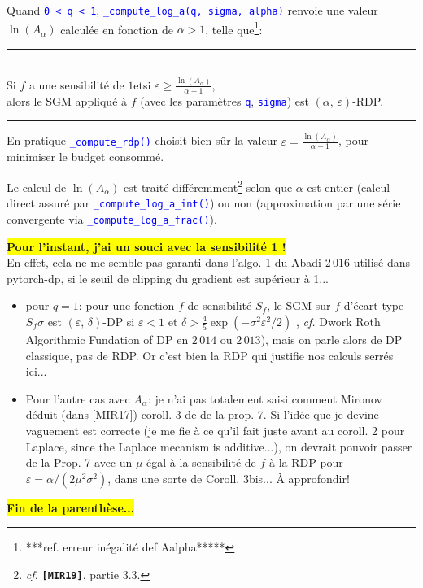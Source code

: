 \documentclass[a4paper,11pt]{article} %
\newcommand{\code}[1]{\textcolor{blue}{\texttt{#1}}}
\newcommand{\REM}[1]{\colorbox{yellow}{\color{red}\textbf{#1}}}
\newcommand{\prop}[1]{\begin{center}\smallskip\rule{0.95\linewidth}{0.5pt}\nopagebreak\\
                      \textsf{#1}\nopagebreak\\
                      \rule{0.95\linewidth}{0.5pt}\smallskip\end{center}}
\begin{document}
Quand \code{0 < q < 1}, \code{\_compute\_log\_a(q, sigma, alpha)} renvoie une valeur $\ln(A_\alpha)$ calculée en fonction de $\alpha>1$, telle que\footnote{***ref. erreur inégalité def Aalpha*****}:
\prop{
    Si $f$ a une sensibilité de $1$\quad et\quad si $\varepsilon \geqslant \frac{\ln (A_\alpha)}{\alpha - 1}$,\\
    alors le SGM appliqué à $f$ (avec les paramètres \code{q}, \code{sigma}) est $(\alpha,\, \varepsilon)$-RDP.
    }
En pratique \code{\_compute\_rdp()} choisit bien sûr la valeur $\varepsilon = \frac{\ln (A_\alpha)}{\alpha - 1}$, pour minimiser le budget consommé. 

Le calcul de $\ln(A_\alpha)$ est traité différemment\footnote{\emph{cf.} \textbf{\texttt{[MIR19]}}, partie \textsf{3.3}.} selon que $\alpha$ est entier (calcul direct assuré par \code{\_compute\_log\_a\_int()}) ou non (approximation par une série convergente via \code{\_compute\_log\_a\_frac()}).

\REM{Pour l'instant, j'ai un souci avec la sensibilité 1 !}\\
En effet, cela ne me semble pas garanti dans l'algo. 1 du \og Abadi $2\,016$\fg{} utilisé dans pytorch-dp, si le seuil de clipping du gradient est supérieur à 1...\vspace{-0.4em}

\begin{itemize}
    \item 
    pour $q=1$: pour une fonction $f$ de sensibilité $S_f$, le SGM sur $f$ d'écart-type $S_f \sigma$ est $(\varepsilon,\, \delta)$-DP si $\varepsilon<1$ et $\delta>\frac{4}{5}\exp(-\sigma^2\varepsilon^2/2)$ , \emph{cf.} Dwork Roth \og Algorithmic Fundation of DP\fg{} en $2\,014$ ou $2\,013$), mais on parle alors de DP classique, pas de RDP. Or c'est bien la RDP qui justifie nos calculs \og serrés\fg{} ici...
    \item 
    Pour l'autre cas avec $A_\alpha$: je n'ai pas totalement saisi comment Mironov déduit (dans [MIR17]) coroll. 3 de de la prop. 7. Si l'idée que je devine vaguement est correcte (je me fie à ce qu'il fait juste avant au coroll. 2 pour Laplace, \og since the Laplace mecanism is additive...\fg{}), on devrait pouvoir passer de la Prop. 7 avec un $\mu$ égal à la sensibilité de $f$ à la RDP pour $\varepsilon = \alpha / (2\mu^2\sigma^2)$, dans une sorte de Coroll. 3bis... À approfondir!
\end{itemize}
\REM{Fin de la parenthèse...}\\
\end{document}
